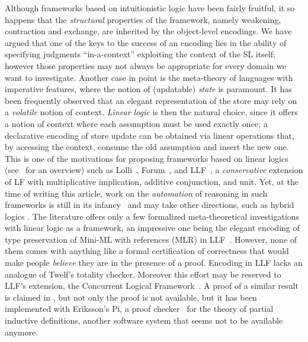 \documentclass[final]{svjour3}
\begin{document}
Although frameworks based on {intuitionistic} logic have been fairly fruitful, it so happens that the \emph{structural} properties of the
framework, namely weakening, contraction and exchange, are inherited
by the object-level encodings.  We have argued that one of
the keys to the success of an encoding lies in the ability of
specifying judgments ``in-a-context'' exploiting the context of the SL
itself; however those properties may not always be appropriate for
every domain we want to investigate.  Another  case in point is the
meta-theory of languages with imperative features, where the notion of
(updatable) \emph{state} is paramount.
It has been frequently observed that an elegant representation of the
store may rely on a \emph{volatile} notion of context.  \emph{Linear
  logic} is then the natural choice, since it offers a notion of
context where each assumption must be used exactly once; a declarative
encoding of store update can be obtained via linear operations that,
by accessing the context, consume the old assumption and insert the
new one. This is one of the motivations for proposing frameworks based
on linear logics (see~\cite{miller04llcs} for an overview) such as
Lolli~\cite{Lolli}, Forum~\cite{Forum}, and LLF~\cite{CervesatoP02}, a
\emph{conservative} extension of LF with multiplicative implication,
additive conjunction, and unit.  Yet, at the time of writing this
article, work on the \emph{automation} of reasoning in such frameworks
is still in its infancy~\cite{McCreight03} and may take other
directions, such as hybrid logics \cite{Reed08}.  The
literature offers only a few formalized meta-theoretical
investigations with linear logic as a framework, an impressive one
being the elegant encoding of type preservation of Mini-ML with
references (MLR) in LLF~\cite{CervesatoP02}. However, none of them
comes with anything like a formal certification of correctness that
would make people \emph{believe} they are in the presence of a proof.
Encoding in LLF lacks an analogue of Twelf's totality
checker. Moreover this effort may be reserved to LLF's extension, the
Concurrent Logical Framework~\cite{clf}.  A \foldn proof of a similar
result is claimed in \cite{McDowell01}, but not only the proof is not
available, but it has been implemented with Eriksson's Pi, a proof
checker~\cite{Eriksson94} for the theory of partial inductive
definitions, another software system that seems not to be available
anymore.
\end{document}
